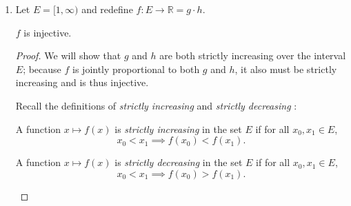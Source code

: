 \begin{enumerate}
\begin{enumerate}
                \break

            \item
                Let $E = [1, \infty)$ and redefine $f: E \rightarrow \mathbb{R} = g \cdot h$.

                \begin{proposition} \label{prop:5}
                    $f$ is injective.
                \end{proposition}

                \begin{proof}

                    We will show that $g$ and $h$ are both strictly increasing over the interval $E$;
                    because $f$ is jointly proportional to both $g$ and $h$, it also must be strictly increasing and is thus injective.

                    Recall the definitions of \emph{strictly increasing} and \emph{strictly decreasing} \parencite{monotonic-function}:
                    \begin{definition} \label{def:strictly-increasing}
                        A function $x \mapsto f(x)$ is \emph{strictly increasing} in the set $E$ if for all $x_0, x_1 \in E$,
                        \[ x_0 < x_1 \implies f(x_0) < f(x_1). \]
                    \end{definition}

                    \begin{definition} \label{def:strictly-decreasing}
                        A function $x \mapsto f(x)$ is \emph{strictly decreasing} in the set $E$ if for all $x_0, x_1 \in E$,
                        \[ x_0 < x_1 \implies f(x_0) > f(x_1). \]
                    \end{definition}

                    \smallskip


\end{proof}
\end{enumerate}
\end{enumerate}
